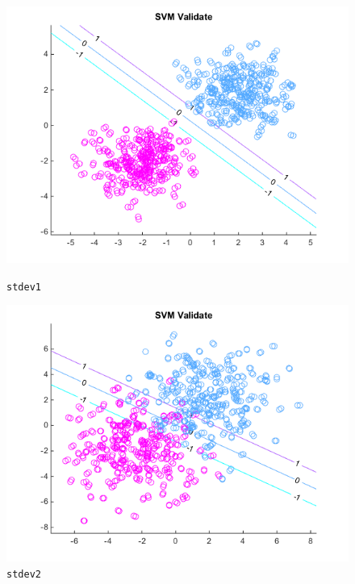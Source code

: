 \documentclass[10pt,letterpaper]{article}
\begin{document}
\begin{center}
\begin{figure}[!htb]
  \includegraphics[width=\linewidth]{figures/stdev1.png}
  \caption{\texttt{stdev1}}\label{fig:stdev1}
\endminipage\hfill
{}
  \includegraphics[width=\linewidth]{figures/stdev2.png}
  \caption{\texttt{stdev2}}
\endminipage
\end{figure}
\begin{figure}[!htb]

\end{figure}
\end{center}
\end{document}
